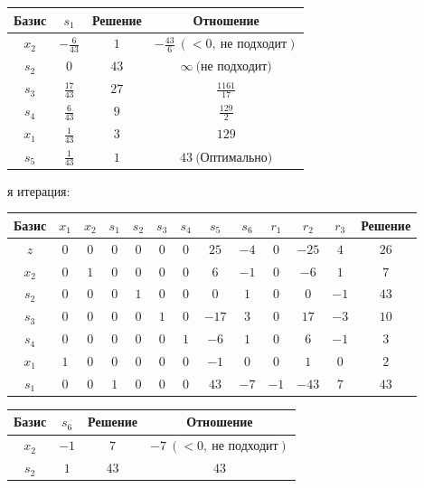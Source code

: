 \documentclass{article}%
\begin{document}
\begin{flushleft}
\newline%
\begin{tabular}{|cccc|}%
\hline%
Базис&$s_{1}$&Решение&Отношение\\%
\hline%
$x_{2}$&$-\frac{6}{43}$&$1$&$-\frac{43}{6}\: (< 0, \: \text{не подходит})$\\%
$s_{2}$&$0$&$43$&$\infty \: \text{(не подходит)}$\\%
$s_{3}$&$\frac{17}{43}$&$27$&$\frac{1161}{17}$\\%
$s_{4}$&$\frac{6}{43}$&$9$&$\frac{129}{2}$\\%
$x_{1}$&$\frac{1}{43}$&$3$&$129$\\%
$s_{5}$&$\frac{1}{43}$&$1$&$43\: \text{(Оптимально)}$\\%
\hline%
\end{tabular}%
\newline%
\newline%
я итерация: %
\newline%
\newline%
\renewcommand{\arraystretch}{1.3}%
\begin{tabular}{|c|ccccccccccc|c|}%
\hline%
Базис&$x_{1}$&$x_{2}$&$s_{1}$&$s_{2}$&$s_{3}$&$s_{4}$&$s_{5}$&$s_{6}$&$r_{1}$&$r_{2}$&$r_{3}$&Решение\\%
\hline%
$z$&$0$&$0$&$0$&$0$&$0$&$0$&$25$&$-4$&$0$&$-25$&$4$&$26$\\%
\hline%
$x_{2}$&$0$&$1$&$0$&$0$&$0$&$0$&$6$&$-1$&$0$&$-6$&$1$&$7$\\%
$s_{2}$&$0$&$0$&$0$&$1$&$0$&$0$&$0$&$1$&$0$&$0$&$-1$&$43$\\%
$s_{3}$&$0$&$0$&$0$&$0$&$1$&$0$&$-17$&$3$&$0$&$17$&$-3$&$10$\\%
$s_{4}$&$0$&$0$&$0$&$0$&$0$&$1$&$-6$&$1$&$0$&$6$&$-1$&$3$\\%
$x_{1}$&$1$&$0$&$0$&$0$&$0$&$0$&$-1$&$0$&$0$&$1$&$0$&$2$\\%
$s_{1}$&$0$&$0$&$1$&$0$&$0$&$0$&$43$&$-7$&$-1$&$-43$&$7$&$43$\\%
\hline%
\end{tabular}%
\newline%
\newline%
\newline%
\begin{tabular}{|cccc|}%
\hline%
Базис&$s_{6}$&Решение&Отношение\\%
\hline%
$x_{2}$&$-1$&$7$&$-7\: (< 0, \: \text{не подходит})$\\%
$s_{2}$&$1$&$43$&$43$\\%

\end{tabular}
\end{flushleft}
\end{document}
